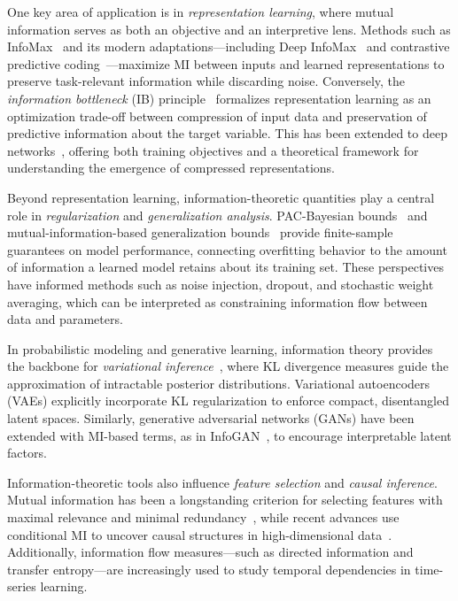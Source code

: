 \documentclass[11pt, oneside]{book}
\theoremstyle{plain}
\theoremstyle{definition}
\theoremstyle{remark}
\begin{document}
One key area of application is in \emph{representation learning}, where mutual information serves as both an objective and an interpretive lens. Methods such as InfoMax~\citep{linsker1988self} and its modern adaptations—including Deep InfoMax~\citep{hjelm2019learning} and contrastive predictive coding~\citep{oord2018representation}—maximize MI between inputs and learned representations to preserve task-relevant information while discarding noise. Conversely, the \emph{information bottleneck} (IB) principle~\citep{tishby2000information} formalizes representation learning as an optimization trade-off between compression of input data and preservation of predictive information about the target variable. This has been extended to deep networks~\citep{alemi2017deep}, offering both training objectives and a theoretical framework for understanding the emergence of compressed representations.

Beyond representation learning, information-theoretic quantities play a central role in \emph{regularization} and \emph{generalization analysis}. PAC-Bayesian bounds~\citep{mcallester1999pac} and mutual-information-based generalization bounds~\citep{xu2017information} provide finite-sample guarantees on model performance, connecting overfitting behavior to the amount of information a learned model retains about its training set. These perspectives have informed methods such as noise injection, dropout, and stochastic weight averaging, which can be interpreted as constraining information flow between data and parameters.

In probabilistic modeling and generative learning, information theory provides the backbone for \emph{variational inference}~\citep{jordan1999introduction,kingma2014auto}, where KL divergence measures guide the approximation of intractable posterior distributions. Variational autoencoders (VAEs) explicitly incorporate KL regularization to enforce compact, disentangled latent spaces. Similarly, generative adversarial networks (GANs) have been extended with MI-based terms, as in InfoGAN~\citep{chen2016infogan}, to encourage interpretable latent factors.

Information-theoretic tools also influence \emph{feature selection} and \emph{causal inference}. Mutual information has been a longstanding criterion for selecting features with maximal relevance and minimal redundancy~\cite{peng2005feature}, while recent advances use conditional MI to uncover causal structures in high-dimensional data~\cite{runge2019detecting}. Additionally, information flow measures—such as directed information and transfer entropy—are increasingly used to study temporal dependencies in time-series learning.
\end{document}
